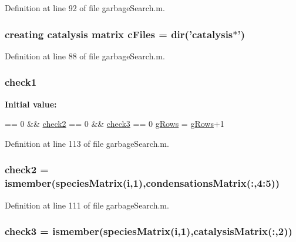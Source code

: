 Definition at line 92 of file garbage\-Search.\-m.

\hypertarget{a00027_a9eab57ccb42a39c704f47dc30e4f4515}{
\subsubsection[{c\-Files}]{\setlength{\rightskip}{0pt plus 5cm}creating {\bf catalysis} matrix c\-Files = dir('{\bf catalysis}$\ast$')}}\label{a00027_a9eab57ccb42a39c704f47dc30e4f4515}


Definition at line 88 of file garbage\-Search.\-m.

\hypertarget{a00027_a62c10db322670bdabb633eb294c4fcec}{
\subsubsection[{check1}]{ check1}}\label{a00027_a62c10db322670bdabb633eb294c4fcec}
{\bfseries Initial value\-:}
\begin{DoxyCode}
== 0 && \hyperlink{a00027_a98a8838a85ed24032563a44271b1525a}{check2} == 0 && \hyperlink{a00027_adfd17509248a56986475a25ee50fe488}{check3} == 0
            \hyperlink{a00027_af33e0ef530936979d29418a30cb262d0}{gRows} = \hyperlink{a00027_af33e0ef530936979d29418a30cb262d0}{gRows}+1
\end{DoxyCode}


Definition at line 113 of file garbage\-Search.\-m.

\hypertarget{a00027_a98a8838a85ed24032563a44271b1525a}{
\subsubsection[{check2}]{\setlength{\rightskip}{0pt plus 5cm}check2 = ismember({\bf species\-Matrix}({\bf i},1),{\bf condensations\-Matrix}(\-:,4\-:5))}}\label{a00027_a98a8838a85ed24032563a44271b1525a}


Definition at line 111 of file garbage\-Search.\-m.

\hypertarget{a00027_adfd17509248a56986475a25ee50fe488}{
\subsubsection[{check3}]{\setlength{\rightskip}{0pt plus 5cm}check3 = ismember({\bf species\-Matrix}({\bf i},1),{\bf catalysis\-Matrix}(\-:,2))}}\label{a00027_adfd17509248a56986475a25ee50fe488}


